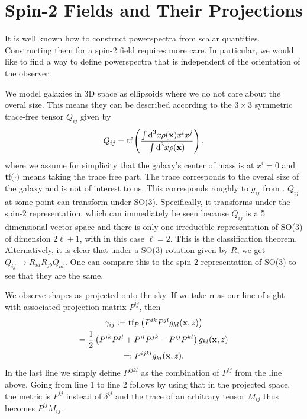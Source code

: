 \documentclass[11pt]{book}
\DeclareRobustCommand{\d}{\ifmmode\text{d}\else d\fi}
\DeclareRobustCommand{\tf}{\ifmmode\text{tf}\else d\fi}
\newcommand{\br}[1]{\ensuremath{\left( #1 \right)}}
\begin{document}
\section{Spin-2 Fields and Their Projections}
It is well known how to construct powerspectra from scalar quantities. Constructing them for a spin-2 field requires more care. In particular, we would like to find a way to define powerspectra that is independent of the orientation of the observer.

We model galaxies in 3D space as ellipsoids where we do not care about the overal size. This means they can be described according to the $3 \times 3$ symmetric trace-free tensor $Q_{ij}$ given by
\begin{equation}
    Q_{ij} = \tf\br{\frac{\int \d^3 x \rho(\mathbf x) x^i x^j}{\int\d^3 x \rho(\mathbf x)}},
\end{equation}
where we assume for simplicity that the galaxy's center of mass is at $x^i=0$ and $\tf (\cdot)$ means taking the trace free part. The trace corresponds to the overal size of the galaxy and is not of interest to us. This corresponds roughly to $g_{ij}$ from \cite{bakx2023effectivefieldtheoryintrinsic}.
$Q_{ij}$ at some point can transform under SO(3). Specifically, it transforms under the spin-2 representation, which can immediately be seen because $Q_{ij}$ is a 5 dimensional vector space and there is only one irreducible representation of SO(3) of dimension $2\ell + 1$, with in this case $\ell = 2$. This is the classification theorem. %
Alternatively, it is clear that under a SO(3) rotation given by $R$, we get $Q_{ij} \rightarrow R_{ia}R_{jb}Q_{ab}$. One can compare this to the spin-2 representation of SO(3) to see that they are the same. %

We observe shapes as projected onto the sky. If we take $\mathbf n$ as our line of sight with associated projection matrix $P^{ij}$, then
\begin{gather}
    \gamma_{ij} := \tf_P\br{P^{ik}P^{jl}g_{kl}(\mathbf x, z)}\\
                = \frac{1}{2}\br{P^{ik}P^{jl} + P^{il}P^{jk} - P^{ij}P^{kl}}g_{kl}(\mathbf x, z)\\
                =: P^{ijkl}g_{kl}(\mathbf x, z).
\end{gather}
In the last line we simply define $P^{ijkl}$ as the combination of $P^{ij}$ from the line above. Going from line 1 to line 2 follows by using that in the projected space, the metric is $P^{ij}$ instead of $\delta^{ij}$ and the trace of an arbitrary tensor $M_{ij}$ thus becomes $P^{ij}M_{ij}$. %
\end{document}
